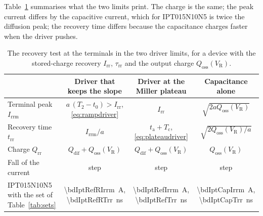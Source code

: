 \documentclass[10pt,a4paper]{scrartcl}
\newcommand{\VR}{V_\mathrm{R}}
\newcommand{\Irr}{I_\mathrm{rr}}
\newcommand{\Irrm}{I_\mathrm{rrm}}
\newcommand{\Qrr}{Q_\mathrm{rr}}
\newcommand{\Qdif}{Q_\mathrm{dif}}
\newcommand{\Qoss}{Q_\mathrm{oss}}
\newcommand{\trr}{t_\mathrm{rr}}
\newcommand{\ta}{t_\mathrm{a}}
\newcommand{\Tc}{T_\mathrm{c}}
\newcommand{\taurr}{\tau_\mathrm{rr}}
\newcommand{\Ttwo}{T_2}
\newcommand{\IPT}{IPT015N10N5}
\begin{document}
Table~\ref{tab:drivers} summarises what the two limits print. The charge is the same; the peak current differs by the capacitive current, which for \IPT{} is twice the diffusion peak; the recovery time differs because the capacitance charges faster when the driver pushes.

\begin{table}[htb]
\centering\small
\caption{The recovery test at the terminals in the two driver limits, for a device with the stored-charge recovery $\Irr$, $\taurr$ and the output charge $\Qoss(\VR)$.}
\label{tab:drivers}
\setlength{\tabcolsep}{5pt}
\begin{tabular}{@{}lccc@{}}
\toprule
 & Driver that keeps the slope & Driver at the Miller plateau & Capacitance alone \\
\midrule
Terminal peak $\Irrm$ & $a\,(\Ttwo - t_0) > \Irr$, \eqref{eq:rampdriver} & $\Irr$ & $\sqrt{2a\Qoss(\VR)}$ \\
Recovery time $\trr$ & $\Irrm/a$ & $\ta + \Tc$, \eqref{eq:plateaudriver} & $\sqrt{2\Qoss(\VR)/a}$ \\
Charge $\Qrr$ & $\Qdif + \Qoss(\VR)$ & $\Qdif + \Qoss(\VR)$ & $\Qoss(\VR)$ \\
Fall of the current & step & step & step \\
\IPT{} with the set of Table~\ref{tab:sets} & \SI{\bdIptRefRIrrm}{\ampere}, \SI{\bdIptRefRTrr}{\nano\second} & \SI{\bdIptRefIrrm}{\ampere}, \SI{\bdIptRefTrr}{\nano\second} & \SI{\bdIptCapIrrm}{\ampere}, \SI{\bdIptCapTrr}{\nano\second} \\
\bottomrule
\end{tabular}
\end{table}
\end{document}
